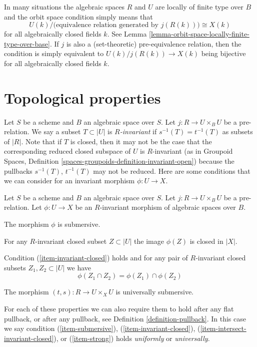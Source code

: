 \noindent
In many situations the algebraic spaces $R$ and $U$ are locally of finite type
over $B$ and the orbit space condition simply means that
$$
U(k)/\big(\text{equivalence relation generated by }j(R(k))\big)
\cong
X(k)
$$
for all algebraically closed fields $k$. See
Lemma \ref{lemma-orbit-space-locally-finite-type-over-base}.
If $j$ is also a (set-theoretic) pre-equivalence relation, then the condition
is simply equivalent to $U(k)/j(R(k)) \to X(k)$ being bijective for all
algebraically closed fields $k$.









\section{Topological properties}
\label{section-topological}

\noindent
Let $S$ be a scheme and $B$ an algebraic space over $S$.
Let $j : R \to U \times_B U$ be a pre-relation.
We say a subset $T \subset |U|$ is {\it $R$-invariant} if
$s^{-1}(T) = t^{-1}(T)$ as subsets of $|R|$.
Note that if $T$ is closed, then it may not be the case that
the corresponding reduced closed subspace of $U$ is $R$-invariant
(as in
Groupoid Spaces, Definition \ref{spaces-groupoids-definition-invariant-open})
because the pullbacks $s^{-1}(T)$, $t^{-1}(T)$ may not be reduced.
Here are some conditions that we can consider for an
invariant morphism $\phi : U \to X$.

\begin{definition}
\label{definition-topological}
Let $S$ be a scheme and $B$ an algebraic space over $S$.
Let $j : R \to U \times_B U$ be a pre-relation.
Let $\phi : U \to X$ be an $R$-invariant morphism of algebraic spaces over $B$.
\begin{list}{(\thesubsubsection)}%
{\setlength{}}
\item
\label{item-submersive}
The morphism $\phi$ is submersive.
\item
\label{item-invariant-closed}
For any $R$-invariant closed subset $Z \subset |U|$ the image
$\phi(Z)$ is closed in $|X|$.
\item
\label{item-intersect-invariant-closed}
Condition (\ref{item-invariant-closed}) holds and for any pair of
$R$-invariant closed subsets $Z_1, Z_2 \subset |U|$ we have
$$
\phi(Z_1 \cap Z_2) = \phi(Z_1) \cap \phi(Z_2)
$$
\item The morphism $(t, s) : R \to U \times_X U$ is universally submersive.
\label{item-strong}
\end{list}
For each of these properties we can also require them to hold after any
flat pullback, or after any pullback, see
Definition \ref{definition-pullback}. In this case we say condition
(\ref{item-submersive}), 
(\ref{item-invariant-closed}),
(\ref{item-intersect-invariant-closed}), or
(\ref{item-strong}) holds {\it uniformly} or {\it universally}.
\end{definition}








